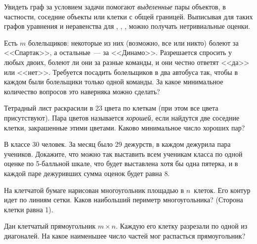 Увидеть граф за условием задачи помогают \emph{выделенные} пары объектов,
в частности, соседние объекты или клетки с общей границей.
Выписывая для таких графов уравнения и неравенства для
, , , можно получать нетривиальные оценки.

\begin{problems}

\item
Есть $m$ болельщиков: некоторые из них (возможно, все или никто) болеют за
<<Спартак>>, а остальные~--- за <<Динамо>>.
Разрешается спросить у любых двоих, болеют ли они за разные команды, и они
честно ответят <<да>> или <<нет>>.
Требуется посадить болельщиков в два автобуса так, чтобы в каждом были
болельщики только одной команды.
За какое минимальное количество вопросов это наверняка можно сделать?

\item
Тетрадный лист раскрасили в 23 цвета по клеткам (при этом все цвета
присутствуют).
Пара цветов называется \emph{хорошей,} если найдутся две соседние клетки,
закрашенные этими цветами.
Каково минимальное число хороших пар?

\item
В классе 30 человек.
За месяц было 29 дежурств, в каждом дежурила пара учеников.
Докажите, что можно так выставить всем ученикам класса по одной оценке
по 5-балльной шкале, что будет выставлена хотя бы одна пятерка, и в каждой паре
дежуривших сумма оценок будет равна 8.

\item
На клетчатой бумаге нарисован многоугольник площадью в $n$~клеток.
Его контур идет по линиям сетки.
Каков наибольший периметр многоугольника?
(Сторона клетки равна 1).

\item
Дан клетчатый прямоугольник $m \times n$.
Каждую его клетку разрезали по одной из диагоналей.
На какое наименьшее число частей мог распасться прямоугольник?

\end{problems}

